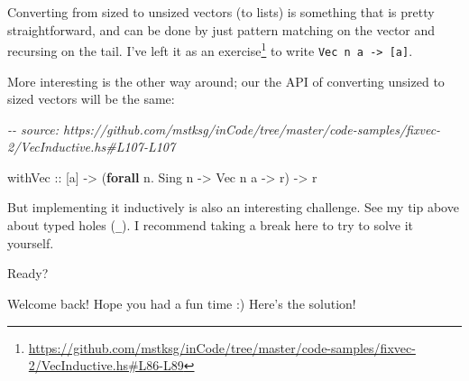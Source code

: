 \documentclass[]{article}
\newenvironment{Shaded}{}{}
\newcommand{\CommentTok}[1]{\textcolor[rgb]{0.38,0.63,0.69}{\textit{#1}}}
\newcommand{\DataTypeTok}[1]{\textcolor[rgb]{0.56,0.13,0.00}{#1}}
\newcommand{\KeywordTok}[1]{\textcolor[rgb]{0.00,0.44,0.13}{\textbf{#1}}}
\newcommand{\NormalTok}[1]{#1}
\newcommand{\OperatorTok}[1]{\textcolor[rgb]{0.40,0.40,0.40}{#1}}
\newcommand{\OtherTok}[1]{\textcolor[rgb]{0.00,0.44,0.13}{#1}}
\renewcommand{\href}[2]{#2\footnote{\url{#1}}}
\begin{document}
Converting from sized to unsized vectors (to lists) is something that is pretty
straightforward, and can be done by just pattern matching on the vector and
recursing on the tail. I've
\href{https://github.com/mstksg/inCode/tree/master/code-samples/fixvec-2/VecInductive.hs\#L86-L89}{left
it as an exercise} to write \texttt{Vec\ n\ a\ -\textgreater{}\ {[}a{]}}.

More interesting is the other way around; our the API of converting unsized to
sized vectors will be the same:

\begin{Shaded}
\begin{Highlighting}[]
\CommentTok{{-}{-} source: https://github.com/mstksg/inCode/tree/master/code{-}samples/fixvec{-}2/VecInductive.hs\#L107{-}L107}

\OtherTok{withVec ::}\NormalTok{ [a] }\OtherTok{{-}\textgreater{}}\NormalTok{ (}\KeywordTok{forall}\NormalTok{ n}\OperatorTok{.} \DataTypeTok{Sing}\NormalTok{ n }\OtherTok{{-}\textgreater{}} \DataTypeTok{Vec}\NormalTok{ n a }\OtherTok{{-}\textgreater{}}\NormalTok{ r) }\OtherTok{{-}\textgreater{}}\NormalTok{ r}
\end{Highlighting}
\end{Shaded}

But implementing it inductively is also an interesting challenge. See my tip
above about typed holes (\texttt{\_}). I recommend taking a break here to try to
solve it yourself.

Ready?

Welcome back! Hope you had a fun time :) Here's the solution!

\begin{Shaded}
\end{Shaded}
\end{document}
